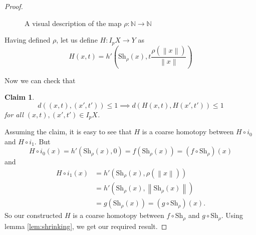 \documentclass {amsart}
\newcommand {\N}        {\mathbb{N}}
\newcommand {\Rplus}    {\mathbb{R}_{+}}
\newcommand {\shr}      {\text {Sh} _{\rho}}
\newcommand {\norm} [1] {\left\| #1 \right\|}
\newtheorem   {claim}       [theorem] {Claim}
\theoremstyle {definition}
\begin{document}
\begin{proof}
\begin{figure}
    \caption {A visual description of the map \( \rho : \N \to \N \)}
    \label{fig:rho}
\end{figure}

Having defined \( \rho \), let us define \( H : I_p X \to Y \) as
\[
  H(x,t) = h' \left(\shr(x), t \frac {\rho (\norm x)} {\norm x}\right)
\]

Now we can check that
\begin{claim}
  \label{claim:technical}
  \[
    d( (x,t), (x', t')) \leq 1
    \implies
    d(H(x,t), H(x', t')) \leq 1
  \]
  for all \( (x,t), (x',t') \in I_p X \).
\end{claim}
Assuming the claim, it is easy to see that \( H \) is a coarse homotopy between
\( H \circ i_0 \) and \( H \circ i_1 \). But
\[
  H \circ i_0 (x) = h' (\shr (x), 0) = f(\shr (x)) = (f \circ \shr) (x)
\]
and
\begin{equation*}
  \begin {aligned}
  H \circ i_1 (x) & = h' (\shr (x), \rho (\norm x)) \\
                  & = h' (\shr (x), \norm {\shr(x)}) \\
                  & = g (\shr (x)) = (g \circ \shr ) (x).
  \end {aligned}
\end{equation*}
So our constructed \( H \) is a coarse homotopy between \( f \circ \shr \) and
\( g \circ \shr \). Using lemma \ref{lem:shrinking}, we get our required result.


\end{proof}
\end{document}
